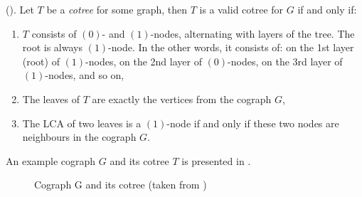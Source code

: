\begin{definition}
(\cite{corneil_perl_stewart_85}). Let $T$ be a \emph{cotree} for some graph, then $T$ is a valid cotree for $G$ if and only if:
\begin{enumerate}
    \item $T$ consists of $(0)$- and $(1)$-nodes, alternating with layers of the tree. The root is always $(1)$-node. In the other words, it consists of: on the 1st layer (root) of $(1)$-nodes, on the 2nd layer of $(0)$-nodes, on the 3rd layer of $(1)$-nodes, and so on,
    \item The leaves of $T$ are exactly the vertices from the cograph $G$,
    \item The LCA of two leaves is a $(1)$-node if and only if these two nodes are neighbours in the cograph $G$.
\end{enumerate}
\end{definition}
An example cograph $G$ and its cotree $T$ is presented in .
\label{Example_cotree}
\begin{figure}
    \centering
    
    \caption{Cograph G and its cotree (taken from \cite{Bretscher2003ASL})}
    \label{fig:graph_example}
\end{figure} 